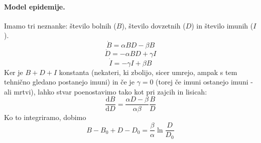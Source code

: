 \documentclass[a4paper]{article}
\newcommand{\dd}[2]{\frac{\mathrm{d} {#1}}{\mathrm{d} {#2}}}
\begin{document}
\paragraph{Model epidemije.} Imamo tri neznanke: število bolnih ($B$), število dovzetnih ($D$) in število imunih ($I$).
$$\dot B = \alpha BD - \beta B$$
$$\dot D = -\alpha BD + \gamma I$$
$$\dot I = - \gamma I + \beta B$$
Ker je $B + D + I$ konstanta (nekateri, ki zbolijo, sicer umrejo, ampak s tem tehnično gledano postanejo imuni) in če je $\gamma = 0$ (torej če imuni ostanejo imuni - ali mrtvi), lahko stvar poenostavimo tako kot pri zajcih in lisicah:
$$\dd{B}{D} = \frac{\alpha D - \beta}{\alpha \beta} \frac{B}{D}$$
Ko to integriramo, dobimo
$$B - B_0 + D - D_0 = \frac{\beta}{\alpha} \ln \frac{D}{D_0}$$
\end{document}
